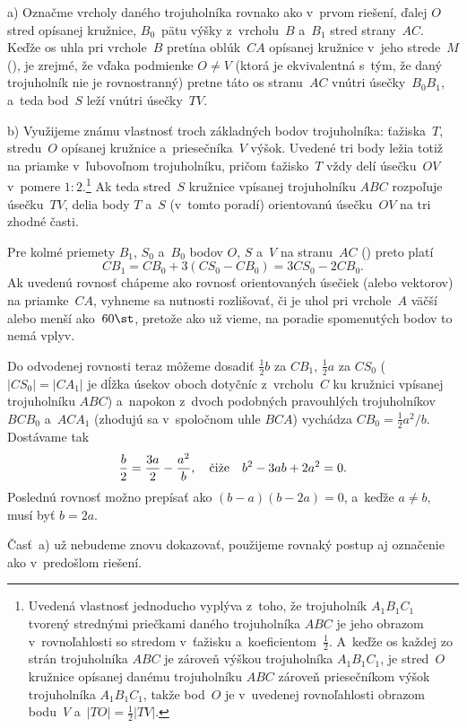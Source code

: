 {\ineriesenie
a)
Označme vrcholy daného trojuholníka rovnako ako v~prvom riešení, ďalej $O$
stred opísanej kružnice, $B_0$~pätu výšky z~vrcholu~$B$ a~$B_1$ stred strany~$AC$.
Keďže os uhla pri vrchole~$B$ pretína oblúk~$CA$ opísanej
kružnice v~jeho strede~$M$ (\obr), je zrejmé, že vďaka podmienke $O\ne V$ (ktorá je
ekvivalentná s~tým, že daný trojuholník nie je rovnostranný) pretne
táto os stranu~$AC$ vnútri úsečky~$B_0B_1$, a~teda bod~$S$ leží vnútri úsečky~$TV$.
%

\smallskip
b)
Využijeme známu vlastnosť troch základných bodov trojuholníka: ťažiska~$T$, stredu~$O$ opísanej
kružnice a~priesečníka~$V$ výšok. Uvedené tri body ležia totiž na priamke
v~ľubovoľnom trojuholníku, pričom ťažisko~$T$ vždy
delí úsečku~$OV$ v~pomere $1:2$.\footnote{Uvedená vlastnosť jednoducho vyplýva z~toho, že
trojuholník $A_1B_1C_1$ tvorený strednými priečkami daného trojuholníka $ABC$ je jeho obrazom
v~rovnoľahlosti so stredom v~ťažisku a~koeficientom~$\frac12$. A~keďže os každej zo strán
trojuholníka $ABC$ je zároveň výškou trojuholníka $A_1B_1C_1$, je stred~$O$ kružnice opísanej danému trojuholníku $ABC$
zároveň priesečníkom výšok trojuholníka $A_1B_1C_1$, takže bod~$O$ je v~uvedenej rovnoľahlosti obrazom
bodu~$V$ a~$|TO|=\frac12|TV|$.} Ak teda stred~$S$ kružnice vpísanej trojuholníku $ABC$ rozpoľuje
úsečku~$TV$, delia body $T$ a~$S$ (v~tomto poradí) orientovanú úsečku~$OV$ na tri zhodné časti.

Pre kolmé priemety $B_1$, $S_0$ a~$B_0$ bodov $O$, $S$ a~$V$ na stranu~$AC$ (\obr) preto platí
$$
CB_1=CB_0+3(CS_0-CB_0)=3CS_0-2CB_0.
$$
Ak uvedenú rovnosť chápeme ako rovnosť orientovaných úsečiek (alebo vektorov)
na priamke~$CA$, vyhneme sa nutnosti rozlišovať, či je uhol pri vrchole~$A$ väčší alebo menší
ako~$60\st$, pretože ako už vieme, na poradie spomenutých bodov to nemá vplyv.
%

Do odvodenej rovnosti teraz môžeme dosadiť $\frac12b$ za $CB_1$, $\frac12a$ za $CS_0$
($|CS_0|=|CA_1|$ je dĺžka úsekov oboch dotyčníc z~vrcholu~$C$ ku kružnici vpísanej
trojuholníku $ABC$) a~napokon z~dvoch podobných pravouhlých trojuholníkov $BCB_0$ a~$ACA_1$
(zhodujú sa v~spoločnom uhle $BCA$) vychádza $CB_0=\frac12a^2/b$. Dostávame tak
$$
{b\over2}={3a\over2}-{a^2\over b},\quad\text{čiže}\quad b^2-3ab+2a^2=0.
$$
Poslednú rovnosť možno prepísať ako $(b-a)(b-2a)=0$, a~keďže $a\ne b$, musí byť $b=2a$.

\ineriesenie
Časť~a) už nebudeme znovu dokazovať, použijeme rovnaký postup aj označenie ako v~predošlom
riešení.

}
